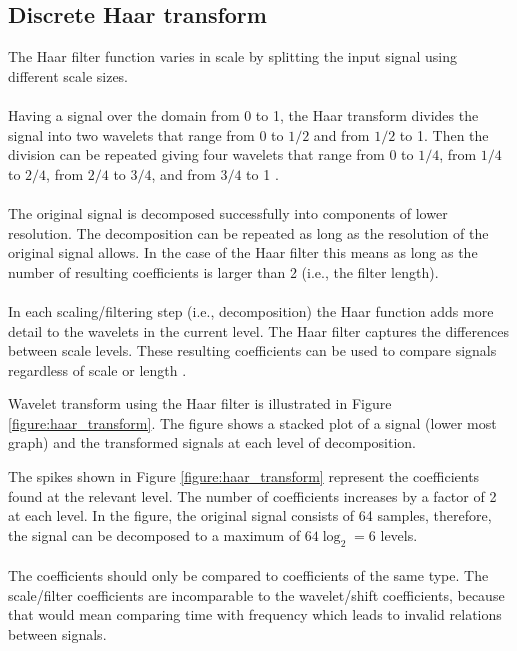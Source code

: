 \subsection{Discrete Haar transform}
The Haar filter function varies in scale by splitting the input signal using
different scale sizes.

\paragraph{}
Having a signal over the domain from 0 to 1, the Haar transform divides the
signal into two wavelets that range from 0 to $1/2$ and from $1/2$ to 1. Then
the division can be repeated giving four wavelets that range from 0 to $1/4$,
from $1/4$ to $2/4$, from $2/4$ to $3/4$, and from $3/4$ to 1 \cite{graps}.

\paragraph{}
The original signal is decomposed successfully into components of lower
resolution. The decomposition can be repeated as long as the resolution of
the original signal allows. In the case of the Haar filter this means as long
as the number of resulting coefficients is larger than 2 (i.e., the filter
length).

\paragraph{}
In each scaling/filtering step (i.e., decomposition) the Haar function adds
more detail to the wavelets in the current level. The Haar filter captures the
differences between scale levels. These resulting coefficients can be used to
compare signals regardless of scale or length \cite{graps}.

Wavelet transform using the Haar filter is illustrated in Figure
\ref{figure:haar_transform}. The figure shows a stacked plot of a signal
(lower most graph) and the transformed signals at each level of decomposition.



The spikes shown in Figure \ref{figure:haar_transform} represent the
coefficients found at the relevant level. The number of coefficients increases
by a factor of 2 at each level. In the figure, the original signal consists of
64 samples, therefore, the signal can be decomposed to a maximum of $64 \log_{2}
= 6$ levels.

\paragraph{}
The coefficients should only be compared to coefficients of the same type. The
scale/filter coefficients are incomparable to the wavelet/shift coefficients,
because that would mean comparing time with frequency which leads to invalid
relations between signals.

